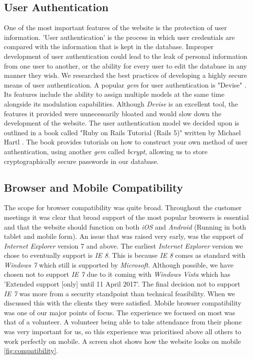 \documentclass{l3proj}
\begin{document}
\subsection{User Authentication}
\label{sec:authentication}

One of the most important features of the website is the protection of user information. 'User authentication' \cite{authentication} is the process in which user credentials are compared with the information that is kept in the database. Improper development of user authentication could lead to the leak of personal information from one user to another, or the ability for every user to edit the database in any manner they wish. We researched the best practices of developing a highly secure means of user authentication. A popular \textit{gem}\cite{gem} for user authentication is "Devise" \cite{devise}. Its features include the ability to assign multiple models at the same time alongside its modulation capabilities. Although \textit{Devise} is an excellent tool, the features it provided were unnecessarily bloated and would slow down the development of the website. The user authentication model we decided upon is outlined in a book called "Ruby on Rails Tutorial (Rails 5)" written by Michael Hartl \cite{rails-tutorial}. The book provides tutorials on how to construct your own method of user authentication, using another \textit{gem} called \textit{bcrypt}, allowing us to store cryptographically secure passwords in our database.

\subsection{Browser and Mobile Compatibility}
\label{sec:compatibility}

The scope for browser compatibility was quite broad. Throughout the customer meetings it was clear that broad support of the most popular browsers is essential and that the website should function on both \textit{iOS} and \textit{Android} (Running in both tablet and mobile form). An issue that was raised very early, was the support of \textit{Internet Explorer} version 7 and above. The earliest \textit{Internet Explorer} version we chose to eventually support is \textit{IE 8}. This is because \textit{IE 8} comes as standard with \textit{Windows 7} which still is supported by \textit{Microsoft}. Although possible, we have chosen not to support \textit{IE 7} due to it coming with \textit{Windows Vista} which has 'Extended support [only] until 11 April 2017'. The final decision not to support \textit{IE 7} was more from a security standpoint than technical feasibility. When we discussed this with the clients they were satisfied. Mobile browser compatibility was one of our major points of focus. The experience we focused on most was that of a volunteer. A volunteer being able to take attendance from their phone was very important for us, so this experience was prioritised above all others to work perfectly on mobile. A screen shot shows how the website looks on mobile \autoref{fig:compatibility}.
\end{document}
